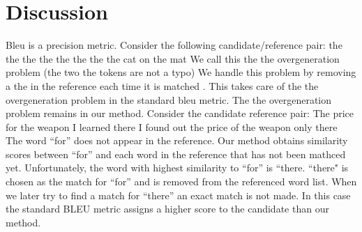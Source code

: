 
\section{Discussion}
\label{sec:discuss}

Bleu is a precision metric. 
Consider the following candidate/reference pair:
the the the the the the the 
the cat on the mat
We call this the  the overgeneration problem (the two the tokens are not a typo)
We handle this problem by removing a the in the reference each time it is matched . 
This takes care of the the overgeneration problem in the standard bleu metric. 
The the overgeneration problem remains in our method. 
Consider the candidate reference pair:
The price for the weapon I learned there
I found out the price of the weapon only there
The word ``for'' does not appear in the reference. 
Our method obtains similarity scores between ``for'' and each word in the reference that has not been mathced yet. 
Unfortunately, the word with highest similarity to ``for'' is ``there. 
``there" is chosen as the match for ``for'' and is removed from the referenced word list. 
When we later try to find a match for ``there'' an exact match is not made. 
In this case the standard BLEU metric assigns a higher score to the candidate than our method. 




